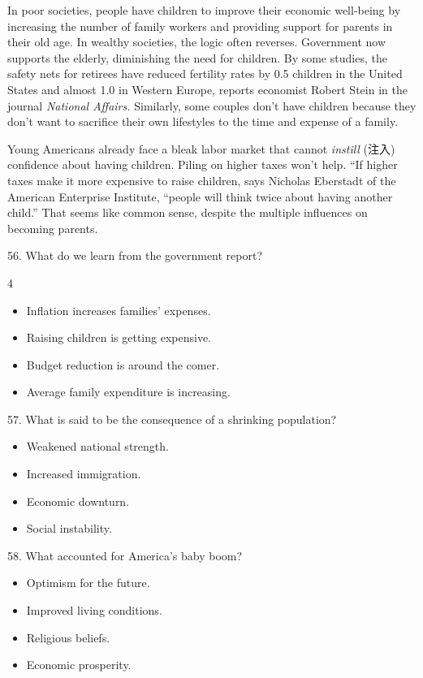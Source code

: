 \documentclass[UTF8,11pt]{ctexart}
\begin{document}
In poor societies, people have children to improve their economic well-being by increasing the number of family workers and providing support for parents in their old age. In wealthy societies, the logic often reverses. Government now supports the elderly, diminishing the need for children. By some studies, the safety nets for retirees have reduced fertility rates by 0.5 children in the United States and almost 1.0 in Western Europe, reports economist Robert Stein in the journal \textit{National Affairs.} Similarly, some couples don’t have children because they don’t want to sacrifice their own lifestyles to the time and expense of a family.


Young Americans already face a bleak labor market that cannot\textit{ instill} (注入) confidence about having children. Piling on higher taxes won’t help. “If higher taxes make it more expensive to raise children, says Nicholas Eberstadt of the American Enterprise Institute, “people will think twice about having another child.” That seems like common sense, despite the multiple influences on becoming parents.


56. What do we learn from the government report?


4


\begin{itemize}[leftmargin=2em,itemsep=.2em,topsep=.4em]\item[A.] Inflation increases families’ expenses.
\item[B.] Raising children is getting expensive.
\item[C.] Budget reduction is around the comer.
\item[D.] Average family expenditure is increasing.
\end{itemize}

57. What is said to be the consequence of a shrinking population?


\begin{itemize}[leftmargin=2em,itemsep=.2em,topsep=.4em]\item[A.] Weakened national strength.
\item[B.] Increased immigration.
\item[C.] Economic downturn.
\item[D.] Social instability.
\end{itemize}

58. What accounted for America’s baby boom?


\begin{itemize}[leftmargin=2em,itemsep=.2em,topsep=.4em]\item[A.] Optimism for the future.
\item[B.] Improved living conditions.
\item[C.] Religious beliefs.
\item[D.] Economic prosperity.
\end{itemize}
\end{document}
